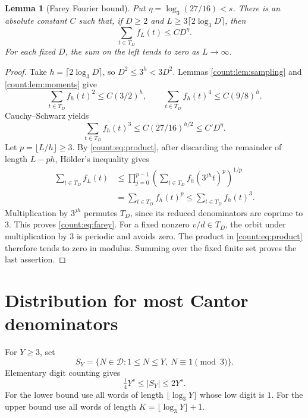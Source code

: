 \documentclass[11pt]{article}
\newtheorem{lemma}[theorem]{Lemma}
\theoremstyle{remark}
\newcommand{\D}{\mathcal D}
\begin{document}
\begin{lemma}[Farey Fourier bound]\label{count:lem:farey}
Put $\eta=\log_3(27/16)<s$. There is an absolute constant $C$ such that,
if $D\ge2$ and $L\ge3\lceil2\log_3D\rceil$, then
\begin{equation}\label{count:eq:farey}
 \sum_{t\in T_D}f_L(t)\le CD^\eta.
\end{equation}
For each fixed $D$, the sum on the left tends to zero as $L\to\infty$.
\end{lemma}
\begin{proof}
Take $h=\lceil2\log_3D\rceil$, so $D^2\le3^h<3D^2$.
Lemmas \ref{count:lem:sampling} and \ref{count:lem:moments} give
\[
 \sum_{t\in T_D}f_h(t)^2\le C(3/2)^h,
 \qquad
 \sum_{t\in T_D}f_h(t)^4\le C(9/8)^h.
\]
Cauchy--Schwarz yields
\begin{equation}\label{count:eq:third}
 \sum_{t\in T_D}f_h(t)^3
 \le C(27/16)^{h/2}\le C'D^\eta.
\end{equation}
Let $p=\lfloor L/h\rfloor\ge3$. By \eqref{count:eq:product}, after discarding
the remainder of length $L-ph$, H\"older's inequality gives
\begin{align*}
 \sum_{t\in T_D}f_L(t)
 &\le\prod_{j=0}^{p-1}
   \left(\sum_{t\in T_D}f_h(3^{jh}t)^p\right)^{1/p}\\
 &=\sum_{t\in T_D}f_h(t)^p
 \le\sum_{t\in T_D}f_h(t)^3.
\end{align*}
Multiplication by $3^{jh}$ permutes $T_D$, since its reduced
denominators are coprime to $3$. This proves \eqref{count:eq:farey}.
For a fixed nonzero $v/d\in T_D$, the orbit under multiplication by $3$
is periodic and avoids zero. The product in \eqref{count:eq:product} therefore
tends to zero in modulus. Summing over the fixed finite set proves the
last assertion.
\end{proof}

\section{Distribution for most Cantor denominators}

For $Y\ge3$, set
\[
 S_Y=\{N\in\D:1\le N\le Y,\ N\equiv1\pmod3\}.
\]
Elementary digit counting gives
\begin{equation}\label{count:eq:SY}
 \tfrac14Y^s\le |S_Y|\le2Y^s.
\end{equation}
For the lower bound use all words of length $\lfloor\log_3Y\rfloor$
whose low digit is $1$. For the upper bound use all words of length
$K=\lfloor\log_3Y\rfloor+1$.
\end{document}
